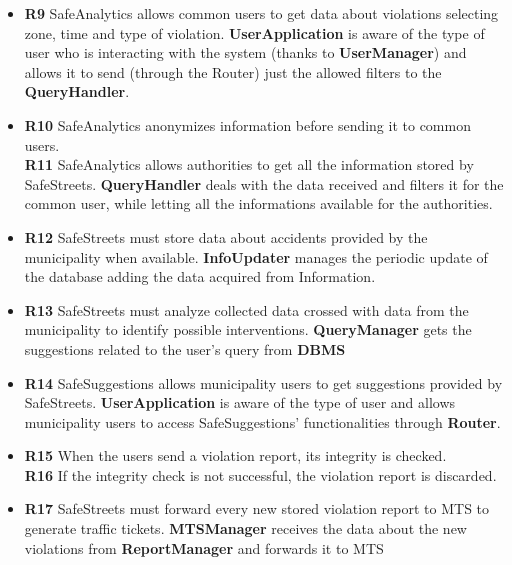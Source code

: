 \documentclass[./main.tex]{subfiles}
\begin{document}

\begin{itemize}
\item
  \textbf{R9} SafeAnalytics allows common users to get data about
  violations selecting zone, time and type of violation.
  \subitem	
	\textbf{UserApplication} is aware of the type of user who is interacting with the system (thanks to \textbf{UserManager}) and allows it to send (through the Router) just the allowed filters to the \textbf{QueryHandler}.
  
\item
  \textbf{R10} SafeAnalytics anonymizes information before sending it to
  common users.\\
  \textbf{R11} SafeAnalytics allows authorities to get all the information
  stored by SafeStreets.
  \subitem
    \textbf{QueryHandler} deals with the data received and filters it for the common user, while letting all the informations available for the authorities.

\end{itemize}

\begin{itemize}
\item
  \textbf{R12} SafeStreets must store data about accidents provided by
  the municipality when available.
  \subitem
    \textbf{InfoUpdater} manages the periodic update of the database adding the data acquired from Information.
    
\item
  \textbf{R13} SafeStreets must analyze collected data crossed with data
  from the municipality to identify possible interventions.
  \subitem
    \textbf{QueryManager} gets the suggestions related to the user's query from \textbf{DBMS} %
    
\item
  \textbf{R14} SafeSuggestions allows municipality users to get
  suggestions provided by SafeStreets.
  \subitem
  	\textbf{UserApplication} is aware of the type of user and  allows municipality users to access SafeSuggestions' functionalities through \textbf{Router}. 
\end{itemize}


\begin{itemize}
\item
  \textbf{R15} When the users send a violation report, its integrity is
  checked. \\
  \textbf{R16} If the integrity check is not successful, the violation
  report is discarded.
  \subitem
  
\item
  \textbf{R17} SafeStreets must forward every new stored violation
  report to MTS to generate traffic tickets.
  \subitem
    \textbf{MTSManager} receives the data about the new violations from \textbf{ReportManager} and forwards it to MTS
\end{itemize}
\end{document}
